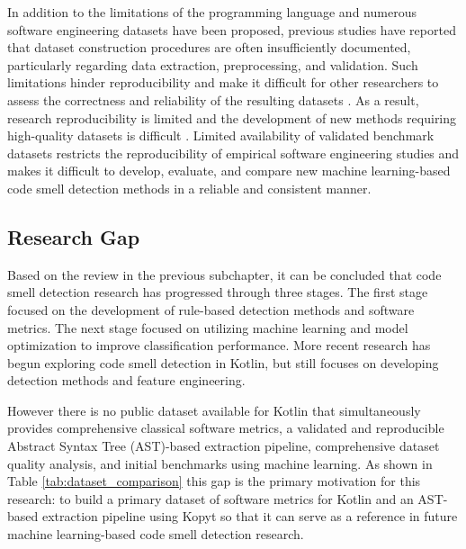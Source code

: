 \documentclass[]{einformatica}
\begin{document}
In addition to the limitations of the programming language \cite{Santana2024} and numerous software engineering datasets have been proposed, previous studies have reported that dataset construction procedures are often insufficiently documented, particularly regarding data extraction, preprocessing, and validation. Such limitations hinder reproducibility and make it difficult for other researchers to assess the correctness and reliability of the resulting datasets \cite{Gonzalez-Barahona2012}\cite{Gonzalez-Barahona2023}\cite{lefeuvre2023fingerprintingbuildinglargereproducible}. As a result, research reproducibility is limited and the development of new methods requiring high-quality datasets is difficult \cite{Bosu_2013}\cite{Gupta2025}\cite{Alomari2025}. Limited availability of validated benchmark datasets restricts the reproducibility of empirical software engineering studies and makes it difficult to develop, evaluate, and compare new machine learning-based code smell detection methods in a reliable and consistent manner.

\subsection{Research Gap}
Based on the review in the previous subchapter, it can be concluded that code smell detection research has progressed through three stages. The first stage focused on the development of rule-based detection methods and software metrics. The next stage focused on utilizing machine learning and model optimization to improve classification performance. More recent research has begun exploring code smell detection in Kotlin, but still focuses on developing detection methods and feature engineering.

However there is no public dataset available for Kotlin that simultaneously provides comprehensive classical software metrics, a validated and reproducible Abstract Syntax Tree (AST)-based extraction pipeline, comprehensive dataset quality analysis, and initial benchmarks using machine learning. As shown in Table \ref{tab:dataset_comparison} this gap is the primary motivation for this research: to build a primary dataset of software metrics for Kotlin and an AST-based extraction pipeline using Kopyt so that it can serve as a reference in future machine learning-based code smell detection research.
\end{document}
